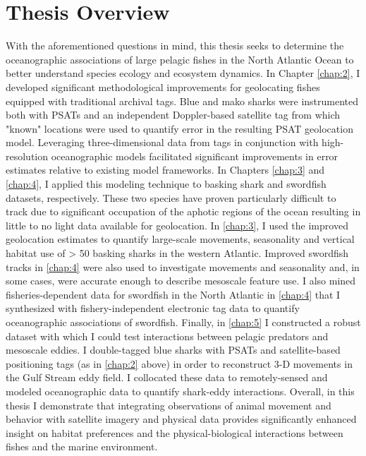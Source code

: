 \section{Thesis Overview}

With the aforementioned questions in mind, this thesis seeks to determine the oceanographic associations of large pelagic fishes in the North Atlantic Ocean to better understand species ecology and ecosystem dynamics. In Chapter \ref{chap:2}, I developed significant methodological improvements for geolocating fishes equipped with traditional archival tags. Blue and mako sharks were instrumented both with PSATs and an independent Doppler-based satellite tag from which "known" locations were used to quantify error in the resulting PSAT geolocation model. Leveraging three-dimensional data from tags in conjunction with high-resolution oceanographic models facilitated significant improvements in error estimates relative to existing model frameworks. In Chapters \ref{chap:3} and \ref{chap:4}, I applied this modeling technique to basking shark and swordfish datasets, respectively. These two species have proven particularly difficult to track due to significant occupation of the aphotic regions of the ocean resulting in little to no light data available for geolocation. In \cref{chap:3}, I used the improved geolocation estimates to quantify large-scale movements, seasonality and vertical habitat use of > 50 basking sharks in the western Atlantic. Improved swordfish tracks in \cref{chap:4} were also used to investigate movements and seasonality and, in some cases, were accurate enough to describe mesoscale feature use. I also mined fisheries-dependent data for swordfish in the North Atlantic in \cref{chap:4} that I synthesized with fishery-independent electronic tag data to quantify oceanographic associations of swordfish. Finally, in \cref{chap:5} I constructed a robust dataset with which I could test interactions between pelagic predators and mesoscale eddies. I double-tagged blue sharks with PSATs and satellite-based positioning tags (as in \cref{chap:2} above) in order to reconstruct 3-D movements in the Gulf Stream eddy field. I collocated these data to remotely-sensed and modeled oceanographic data to quantify shark-eddy interactions. Overall, in this thesis I demonstrate that integrating observations of animal movement and behavior with satellite imagery and physical data provides significantly enhanced insight on habitat preferences and the physical-biological interactions between fishes and the marine environment.

